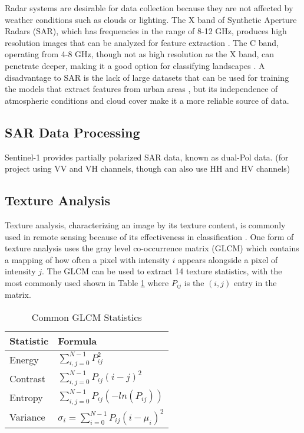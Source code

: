 \documentclass[conference]{IEEEtran}
\begin{document}
		Radar systems are desirable for data collection because they are not affected by weather conditions such as clouds or lighting.
		The X band of Synthetic Aperture Radars (SAR), which has frequencies in the range of 8-12 GHz, produces high resolution images that can be analyzed for feature extraction \cite{Wurm_2017}.
		The C band, operating from 4-8 GHz, though not as high resolution as the X band, can penetrate deeper, making it a good option for classifying landscapes \cite{Hu_2018}. 
		A disadvantage to SAR is the lack of large datasets that can be used for training the models that extract features from urban areas \cite{Shi_Wenzhong_2020}, but its independence of atmospheric conditions and cloud cover make it a more reliable source of data. 


	\subsection{SAR Data Processing}
		Sentinel-1 provides partially polarized SAR data, known as dual-Pol data. (for project using VV and VH channels, though can also use HH and HV channels)
		
	\subsection{Texture Analysis}
		Texture analysis, characterizing an image by its texture content, is commonly used in remote sensing because of its effectiveness in classification \cite{Huang_2014}.
		One form of texture analysis uses the gray level co-occurrence matrix (GLCM) which contains a mapping of how often a pixel with intensity $i$ appears alongside a pixel of intensity $j$.
		The GLCM can be used to extract 14 texture statistics, with the most commonly used shown in Table \ref{tab:glcm_formulas} where $P_{ij}$ is the $(i,j)$ entry in the matrix. 
		
		\begin{table}[htbp]
			\caption{Common GLCM Statistics}
			\centering
			\begin{tabular}{ll} %
				\\[1ex]
				Statistic & Formula \\ %
				\hline\hline %
				Energy & $\displaystyle\sum_{i,j=0}^{N-1} P_{ij}^2$ \\
				Contrast & $\displaystyle\sum_{i,j=0}^{N-1} P_{ij}(i-j)^2$ \\
				Entropy & $\displaystyle\sum_{i,j=0}^{N-1} P_{ij}(-ln(P_{ij}))$ \\
				Variance & $\sigma_i = \displaystyle\sum_{i=0}^{N-1} P_{ij}(i-\mu_i)^2$ \\[1ex] %
				\hline %
			\end{tabular}
			\label{tab:glcm_formulas}
		\end{table}
\end{document}
